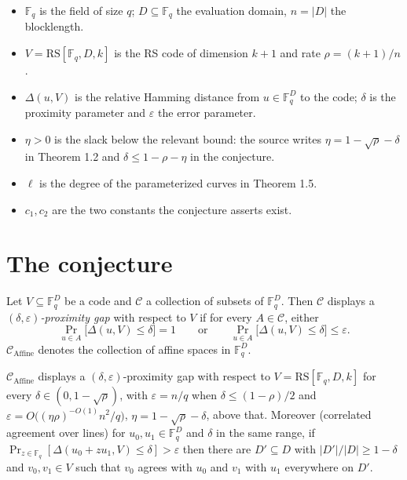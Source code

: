 \documentclass{conjura-conjecture}
\newcommand{\F}{\mathbb{F}}
\newcommand{\eps}{\varepsilon}
\newcommand{\RS}{\mathrm{RS}}
\newcommand{\Caff}{\mathcal{C}_{\mathrm{Affine}}}
\newcommand{\dist}{\Delta}
\begin{document}
\begin{itemize}[nosep]
  \item $\F_{q}$ is the field of size $q$; $D \subseteq \F_{q}$ the
    evaluation domain, $n = |D|$ the blocklength.
  \item $V = \RS[\F_{q}, D, k]$ is the RS code of dimension $k+1$ and
    rate $\rho = (k+1)/n$.
  \item $\dist(u, V)$ is the relative Hamming distance from $u \in
    \F_{q}^{D}$ to the code; $\delta$ is the proximity parameter and
    $\eps$ the error parameter.
  \item $\eta > 0$ is the slack below the relevant bound: the source
    writes $\eta = 1 - \sqrt{\rho} - \delta$ in Theorem 1.2 and
    $\delta \le 1 - \rho - \eta$ in the conjecture.
  \item $\ell$ is the degree of the parameterized curves in
    Theorem 1.5.
  \item $c_{1}, c_{2}$ are the two constants the conjecture asserts
    exist.
\end{itemize}

\section{The conjecture}\label{sec:conjectures}

\begin{definition}
  \label{def:gap}
Let $V \subseteq \F_{q}^{D}$ be a code and $\mathcal{C}$ a collection of
subsets of $\F_{q}^{D}$. Then $\mathcal{C}$ displays a
\emph{$(\delta,\eps)$-proximity gap} with respect to $V$ if for every $A
\in \mathcal{C}$, either
\[
  \Pr_{u \in A}\bigl[ \dist(u, V) \le \delta \bigr] = 1
  \qquad\text{or}\qquad
  \Pr_{u \in A}\bigl[ \dist(u, V) \le \delta \bigr] \le \eps.
\]
$\Caff$ denotes the collection of affine spaces in $\F_{q}^{D}$.
\end{definition}

\begin{theorem}
  \label{thm:known}
$\Caff$ displays a $(\delta,\eps)$-proximity gap with respect to $V =
\RS[\F_{q},D,k]$ for every $\delta \in (0, 1 - \sqrt{\rho})$, with
$\eps = n/q$ when $\delta \le (1-\rho)/2$ and $\eps =
O\bigl((\eta\rho)^{-O(1)} n^{2}/q\bigr)$, $\eta = 1 - \sqrt{\rho} -
\delta$, above that. Moreover (correlated agreement over lines) for
$u_{0}, u_{1} \in \F_{q}^{D}$ and $\delta$ in the same range, if
$\Pr_{z \in \F_{q}}[\dist(u_{0} + z u_{1}, V) \le \delta] > \eps$ then
there are $D' \subseteq D$ with $|D'|/|D| \ge 1 - \delta$ and $v_{0},
v_{1} \in V$ such that $v_{0}$ agrees with $u_{0}$ and $v_{1}$ with
$u_{1}$ everywhere on $D'$.
\end{theorem}
\end{document}
